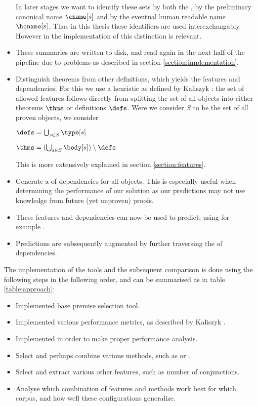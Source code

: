 \begin{itemize}
		In later stages we want to identify these sets by both the \coqobj[s],
		by the preliminary canonical name $\cname[s]$ and by the eventual human readable name $\hcname[s]$.
		Thus in this thesis these identifiers are used interexchangably.
		However in the implementation of \roerei this distinction is relevant.
	\item These summaries are written to disk, and read again in the next half of the pipeline due to problems as described in section \ref{section:implementation}.
	\item Distinguish theorems from other definitions, which yields the features and dependencies.
		For this we use a heuristic as defined by Kaliszyk \cite{kaliszyk2014machine}:
		the set of allowed features follows directly from splitting the set of all objects into either theorems $\thms$ or definitions $\defs$.
		Were we consider $S$ to be the set of all proven \coq objects, we consider
		\begin{definition}
			$\defs = \bigcup_{s \in S} \type[s]$
		\end{definition}
		\begin{definition}
			$\thms = (\bigcup_{s \in S} \body[s]) \setminus \defs$
		\end{definition}
		This is more extensively explained in section \ref{section:features}.
    \item Generate a \dagraph of dependencies for all \coq objects.
		This is especially useful when determining the performance of our solution as our predictions may not use
		knowledge from future (yet unproven) proofs.
	\item These features and dependencies can now be used to predict, using for example \knn.
	\item Predictions are subsequently augmented by further traversing the \dagraph of dependencies.
\end{itemize}

The implementation of the tools and the subsequent comparison is done using the following steps in the following order, and can be summarised as in table \ref{table:approach}:
\begin{itemize}
	\item Implemented base premise selection tool.
	\item Implemented various performance metrics, as described by Kaliszyk \cite{kaliszyk2014machine}.
	\item Implemented \crossvalidation in order to make proper performance analysis.
    \item Select and perhaps combine various \machinelearning methods, such as \nb or \ensemble.
	\item Select and extract various other features, such as number of conjunctions.
    \item Analyse which combination of features and \machinelearning methods work best for which corpus, and how well these configurations generalize.
\end{itemize}

